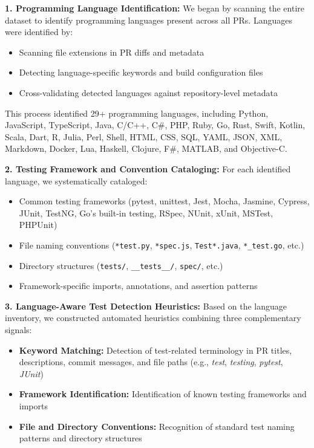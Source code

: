 \documentclass[conference]{IEEEtran}
\begin{document}
\textbf{1. Programming Language Identification:} We began by scanning the entire dataset to identify programming languages present across all PRs. Languages were identified by:
\begin{itemize}
    \item Scanning file extensions in PR diffs and metadata
    \item Detecting language-specific keywords and build configuration files
    \item Cross-validating detected languages against repository-level metadata
\end{itemize}

This process identified 29+ programming languages, including Python, JavaScript, TypeScript, Java, C/C++, C\#, PHP, Ruby, Go, Rust, Swift, Kotlin, Scala, Dart, R, Julia, Perl, Shell, HTML, CSS, SQL, YAML, JSON, XML, Markdown, Docker, Lua, Haskell, Clojure, F\#, MATLAB, and Objective-C.

\textbf{2. Testing Framework and Convention Cataloging:} For each identified language, we systematically cataloged:
\begin{itemize}
    \item Common testing frameworks (pytest, unittest, Jest, Mocha, Jasmine, Cypress, JUnit, TestNG, Go's built-in testing, RSpec, NUnit, xUnit, MSTest, PHPUnit)
    \item File naming conventions (\texttt{*test.py}, \texttt{*spec.js}, \texttt{Test*.java}, \texttt{*\_test.go}, etc.)
    \item Directory structures (\texttt{tests/}, \texttt{\_\_tests\_\_/}, \texttt{spec/}, etc.)
    \item Framework-specific imports, annotations, and assertion patterns
\end{itemize}

\textbf{3. Language-Aware Test Detection Heuristics:} Based on the language inventory, we constructed automated heuristics combining three complementary signals:

\begin{itemize}
    \item \textbf{Keyword Matching:} Detection of test-related terminology in PR titles, descriptions, commit messages, and file paths (e.g., \textit{test}, \textit{testing}, \textit{pytest}, \textit{JUnit})
    
    \item \textbf{Framework Identification:} Identification of known testing frameworks and imports
    
    \item \textbf{File and Directory Conventions:} Recognition of standard test naming patterns and directory structures
\end{itemize}
\end{document}
